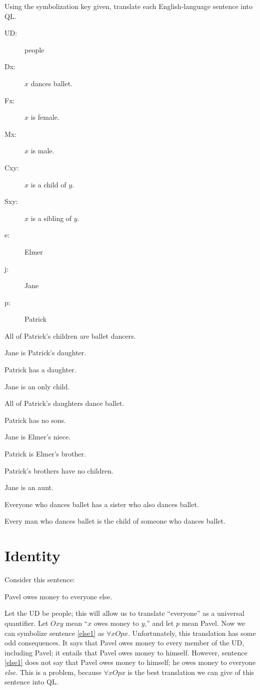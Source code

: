 \problempart
\label{pr.QLballet}
Using the symbolization key given, translate each English-language sentence into QL.
\begin{description}
\item[UD:] people
\item[Dx:] $x$ dances ballet.
\item[Fx:] $x$ is female.
\item[Mx:] $x$ is male.
\item[Cxy:] $x$ is a child of $y$.
\item[Sxy:] $x$ is a sibling of $y$.
\item[e:] Elmer
\item[j:] Jane
\item[p:] Patrick
\end{description}
\begin{kormanize}
\item All of Patrick's children are ballet dancers.
\item Jane is Patrick's daughter.
\item Patrick has a daughter.
\item Jane is an only child.
\item All of Patrick's daughters dance ballet.
\item Patrick has no sons.
\item Jane is Elmer's niece.
\item Patrick is Elmer's brother.
\item Patrick's brothers have no children.
\item Jane is an aunt.
\item Everyone who dances ballet has a sister who also dances ballet.
\item Every man who dances ballet is the child of someone who dances ballet.
\end{kormanize}

\section{Identity}
\setlength{\parindent}{1em}
\label{sec.identity}


Consider this sentence:
\begin{kormanize}
\item[\ex{else1}] Pavel owes money to everyone else.
\end{kormanize}
Let the UD be people; this will allow us to translate ``everyone'' as a universal quantifier. Let $Oxy$ mean ``$x$ owes money to $y$,'' and let $p$ mean Pavel. Now we can symbolize sentence \ref{else1} as $\forall x Opx$. Unfortunately, this translation has some odd consequences. It says that Pavel owes money to every member of the UD, including Pavel; it entails that Pavel owes money to himself. However, sentence \ref{else1} does not say that Pavel owes money to himself; he owes money to everyone \emph{else}. This is a problem, because $\forall x Opx$ is the best translation we can give of this sentence into QL.

